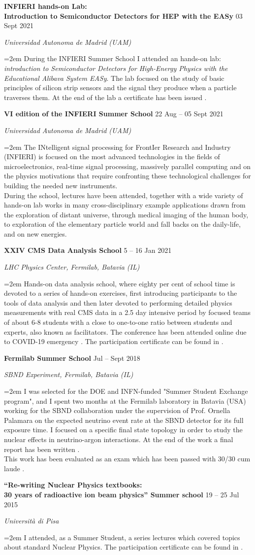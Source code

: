 \documentclass[paper=a4,fontsize=12pt]{article} %
\newcommand{\sepspace}{\vspace*{1em}}		%
\newcommand{\EducationEntry}[4]{
	\noindent \textbf{#1} \hfill      %
	{#2} \par  %
	\noindent \textit{#3} \par        %
	\noindent\hangindent=2em\hangafter=0 \small #4 %
	\normalsize \par}
\begin{document}
	\sepspace
	\EducationEntry{INFIERI hands-on Lab: \\ Introduction to Semiconductor Detectors for HEP with the EASy}{03 Sept 2021}{Universidad Autonoma de Madrid (UAM)}{During the INFIERI Summer School I attended an hands-on lab: \textit{introduction to Semiconductor Detectors for High-Energy Physics with the Educational Alibava System EASy}. The lab focused on the study of basic principles of silicon strip sensors and the signal they produce when a particle traverses them. At the end of the lab a certificate has been issued \cite{Easy_Certificate}.}
    \sepspace 	
	\EducationEntry{VI edition of the INFIERI Summer School}{ 22 Aug -- 05 Sept 2021 }{Universidad Autonoma de Madrid (UAM)}{The INtelligent signal processing for FrontIer Research and Industry (INFIERI) is focused on the most advanced technologies in the fields of microelectronics, real-time signal processing, massively parallel computing and on the physics motivations that require confronting these technological challenges for building the needed new instruments. \\ During the school, lectures have been attended, together with a wide variety of hands-on lab works in many cross-disciplinary example applications drawn from the exploration of distant universe, through medical imaging of the human body, to exploration of the elementary particle world and fall backs on the daily-life, and on new energies. \cite{INFIERI}}
    \sepspace 
    \EducationEntry{XXIV CMS Data Analysis School}{5 -- 16 Jan 2021}{LHC Physics Center, Fermilab, Batavia (IL)}{Hands-on data analysis school, where eighty per cent of school time is devoted to a series of hands-on exercises, first introducing participants to the tools of data analysis and then later devoted to performing detailed physics measurements with real CMS data in a 2.5 day intensive period by focused teams of about 6-8 students with a close to one-to-one ratio between students and experts, also known as facilitators. The conference has been attended online due to COVID-19 emergency \cite{cmsdasindico}. The participation certificate can be found in \cite{cmsdas}.}
	\sepspace	
	\EducationEntry{Fermilab Summer School}{Jul -- Sept 2018}{SBND Experiment, Fermilab, Batavia (IL)}{I was selected for the DOE and INFN-funded "Summer Student Exchange program", and I spent two months at the Fermilab laboratory in Batavia (USA) working for the SBND collaboration under the supervision of Prof. Ornella Palamara on the expected neutrino event rate at the SBND detector for its full exposure time. I focused on a specific final state topology in order to study the nuclear effects in neutrino-argon interactions. At the end of the work a final report has been written \cite{Fermilab_report}. \\ \noindent This work has been evaluated as an exam which has been passed with 30/30 cum laude \cite{partecip_fermilab}.}
    \sepspace
    \EducationEntry{``Re-writing Nuclear Physics textbooks: \\ 30 years of radioactive ion beam physics'' Summer school}{19 -- 25 Jul 2015}{Università di Pisa}
	{I attended, as a Summer Student, a series lectures which covered topics about standard Nuclear Physics. The participation certificate can be found in \cite{summer_school_pisa}.}
\end{document}

